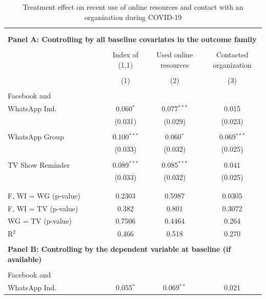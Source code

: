 \documentclass[12pt]{article}
\begin{document}
\begin{table}[H] \centering 
\vspace*{-1cm}  \caption{Treatment effect on recent use of online resources and contact with an organization during COVID-19} 
  \label{} 
\footnotesize 
\begin{tabular}{@{\extracolsep{25pt}}lccc} 
\\[-1.8ex]\hline 
\hline \\[-1.8ex] 
\\[-0.5ex] 
\multicolumn{4}{l}{\textbf{Panel A: Controlling by all baseline covariates in the outcome family}} \\
\hline \\[-1ex] 
 & \shortstack{Index of \\ (1,1) } & \shortstack{Used online\\ resources} & \shortstack{Contacted \\ organization} \\ 
\\[-1.8ex] & (1) & (2) & (3)\\ 
\hline \\[-1.8ex] 
 Facebook and \\ WhatsApp Ind. & 0.060$^{*}$ & 0.077$^{***}$ & 0.015 \\ 
  & (0.031) & (0.029) & (0.023) \\ 
  & & & \\ 
 WhatsApp Group & 0.100$^{***}$ & 0.060$^{*}$ & 0.069$^{***}$ \\ 
  & (0.033) & (0.032) & (0.025) \\ 
  & & & \\ 
 TV Show Reminder & 0.089$^{***}$ & 0.085$^{***}$ & 0.041 \\ 
  & (0.033) & (0.032) & (0.025) \\ 
  & & & \\ 
\hline \\[-1.8ex] 
F, WI = WG (p-value) & 0.2303 & 0.5987 & 0.0305 \\ 
F, WI = TV (p-value) & 0.382 & 0.801 & 0.3072 \\ 
WG = TV (p-value) & 0.7506 & 0.4464 & 0.264 \\ 
R$^{2}$ & 0.466 & 0.518 & 0.270 \\ 
\hline 
\\[-0.5ex] 
\multicolumn{4}{l}{\textbf{Panel B: Controlling by the dependent variable at baseline (if available)}} \\
\hline \\[-1ex]  
 Facebook and \\ WhatsApp Ind. & 0.055$^{*}$ & 0.069$^{**}$ & 0.021 \\ 

\end{tabular}
\end{table}
\end{document}
